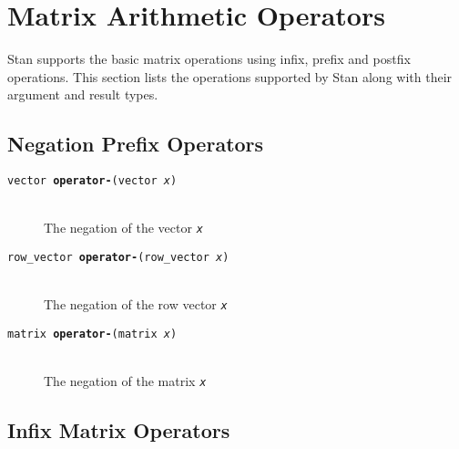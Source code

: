 \documentclass[10pt]{report}
\newcommand{\Stan}{Stan\xspace}
\newcommand{\fitem}[4]{\item[{\tt #1 {\bfseries #2}(#3)}]\mbox{ } \\[4pt] #4}
\newcommand{\farg}[1]{{\tt\slshape #1}}
\begin{document}
\section{Matrix Arithmetic Operators}

\Stan supports the basic matrix operations using infix, prefix and
postfix operations.  This section lists the operations supported by
\Stan along with their argument and result types.

\subsection{Negation Prefix Operators}

\begin{description}
%
\fitem{vector}{operator-}{vector \farg{x}}{The negation of the vector
\farg{x}}
%
\fitem{row\_vector}{operator-}{row\_vector \farg{x}}{The negation of the row
vector \farg{x}}
%
\fitem{matrix}{operator-}{matrix \farg{x}}{The negation of the matrix
  \farg{x}}
%
\end{description}


\subsection{Infix Matrix Operators}
\end{document}
